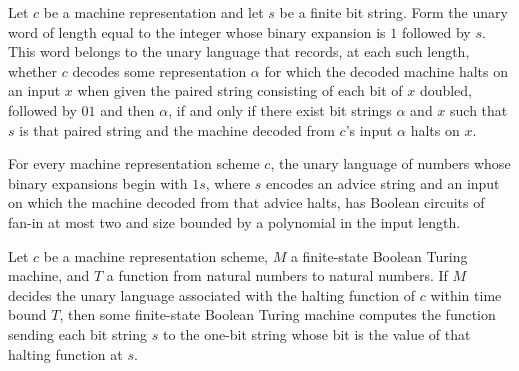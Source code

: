 \begin{theorem}
\label{Complexity.replicate_numOfString_mem_UHALT_iff}
\leanok
{}
Let $c$ be a machine representation and let $s$ be a finite bit string. Form the unary
word of length equal to the integer whose binary expansion is $1$ followed by $s$. This
word belongs to the unary language that records, at each such length, whether $c$
decodes some representation $\alpha$ for which the decoded machine halts on an input $x$
when given the paired string consisting of each bit of $x$ doubled, followed by $01$ and
then $\alpha$, if and only if there exist bit strings $\alpha$ and $x$ such that $s$ is that
paired string and the machine decoded from $c$'s input $\alpha$ halts on $x$.
\end{theorem}

\begin{theorem}
\label{Complexity.UHALT_mem_PPoly}
\leanok
{}
For every machine representation scheme $c$, the unary language of numbers whose binary
expansions begin with $1s$, where $s$ encodes an advice string and an input on which the
machine decoded from that advice halts, has Boolean circuits of fan-in at most two and
size bounded by a polynomial in the input length.
\end{theorem}

\begin{theorem}
\label{Complexity.HALT_computable_of_decidesInTime_UHALT}
\leanok
{}
Let $c$ be a machine representation scheme, $M$ a finite-state Boolean Turing machine,
and $T$ a function from natural numbers to natural numbers. If $M$ decides the unary
language associated with the halting function of $c$ within time bound $T$, then some
finite-state Boolean Turing machine computes the function sending each bit string $s$ to
the one-bit string whose bit is the value of that halting function at $s$.
\end{theorem}


